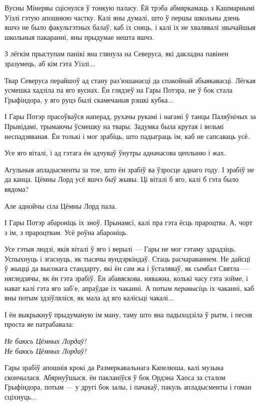 Вусны Мінервы сціснулся ў тонкую паласу. Ёй трэба абмяркамаць з Кашмарнымі Уізлі
гэтую апошнюю частку. Калі яны думалі, што ў першы школьны дзень яшчэ не было 
факультэтных балаў, каб іх сняць, і калі іх не хвалявалі звычайшыя школьныя пакаранні,
яны прыдумае нешта яшчэ.

З лёгкім прыступам панікі яна глянула на Северуса, які дакладна павінен зразумець, аб кім гэта Уізлі...


Твар Северуса перайшоў ад стану раз'юшанасці да спакойнай абыякавасці. Лёгкая 
усмешка хадзіла па яго вуснах. Ён глядзеў на Гары Потэра, не ў бок стала Грыфіндора,
у яго руцэ былі скамечаныя рэшкі кубка...

І Гары Потэр прасоўваўся наперад, рухачы рукамі і нагамі ў танцы Паляўнічых за 
Прывідамі, трымаючы ўсмешку на твары. Задумка была крутая і вельмі неспадзяваная.
Ён толькі і мог зрабіць, што падыграць ім, каб не сапсаваць усё.

Усе яго віталі, і ад гэтага ён адчуваў ўнутры адначасова 
цеплыню і жах.

Агульныя апладысменты за тое, што ён зрабіў ва ўзросце аднаго году. І зрабіў не да канца.
Цёмны Лорд усё яшчэ быў жывы. Ці віталі б яго, калі б гэта было вядома?

Але аднойчы сіла Цёмны Лорд пала.

І Гары Потэр абароніць іх зноў. Прынамсі, калі пра гэта ёсць прароцтва. А, чорт з 
ім, з прароцтвам. Усё роўна абароніць.

Усе гэтыя людзі, якія віталі ў яго і верылі --- Гары не мог гэтаму здрадзіць.
Успыхнуць і згаснуць, як тысячы вундэркіндаў. Стаць расчараваннем. Не дайсці 
ў жыцці да высокага стандарту, які ён сам жа і ўсталяваў, як сымбал Святла ---
нягледзячы, як ён гэта зрабіў. Ён абавяскова, няважна, колькі часу гэта зойме, 
і нават калі гэта яго заб'е, апраўдае іх чаканні. А потым \emph{перавысіць}
іх чаканні, каб яны потым здзіўляліся, як мала ад яго калісьці чакалі...

І ён выкрыкнуў прыдуманую ім ману, таму што яна падыходзіла ў рытм, і 
песня проста яе патрабавала:


\begin{center}
    \emph{Не баюсь Цёмных Лордаў!\\
Не баюсь Цёмных Лордаў!}
\end{center}

Гары зрабіў апошнія крокі да Размеркавальнага Капелюша, калі музыка скончылася.
Абярнуўшыся, ён пакланіўся ў бок
Ордэна Хаоса за сталом Грыфіндора, потым --- у другі бок залы, і 
пачакаў, пакуль апладысменты і гоман сціхнуць...


